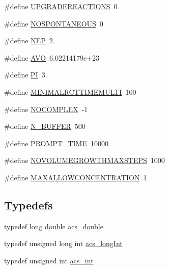 \begin{DoxyCompactItemize}
\#define \hyperlink{a00024_a5119e853077046684673dad15af9199f}{U\-P\-G\-R\-A\-D\-E\-R\-E\-A\-C\-T\-I\-O\-N\-S}~0
\item 
\#define \hyperlink{a00024_a9ea25e0eb039e29accaed6cb99632deb}{N\-O\-S\-P\-O\-N\-T\-A\-N\-E\-O\-U\-S}~0
\item 
\#define \hyperlink{a00024_a029d801cdb598a397cb99ea968a64dc2}{N\-E\-P}~2.
\item 
\#define \hyperlink{a00024_a174754c04acfba9e1f66ba249e68643a}{A\-V\-O}~6.\-02214179e+23
\item 
\#define \hyperlink{a00024_a598a3330b3c21701223ee0ca14316eca}{P\-I}~3.
\item 
\#define \hyperlink{a00024_aa7d0d45ef785688de1c634290ceb02e7}{M\-I\-N\-I\-M\-A\-L\-R\-C\-T\-T\-I\-M\-E\-M\-U\-L\-T\-I}~100
\item 
\#define \hyperlink{a00024_a8da7044a9c837d5544508f9fa400ea52}{N\-O\-C\-O\-M\-P\-L\-E\-X}~-\/1
\item 
\#define \hyperlink{a00024_a2608b9496c2fae19afe620cc801c1967}{N\-\_\-\-B\-U\-F\-F\-E\-R}~500
\item 
\#define \hyperlink{a00024_a6e32fce4415266c0aecd671afba386d5}{P\-R\-O\-M\-P\-T\-\_\-\-T\-I\-M\-E}~10000
\item 
\#define \hyperlink{a00024_aaa9f3c25a2df117014005dabd9c43f77}{N\-O\-V\-O\-L\-U\-M\-E\-G\-R\-O\-W\-T\-H\-M\-A\-X\-S\-T\-E\-P\-S}~1000
\item 
\#define \hyperlink{a00024_a49e518711039e167e47bd51aed053390}{M\-A\-X\-A\-L\-L\-O\-W\-C\-O\-N\-C\-E\-N\-T\-R\-A\-T\-I\-O\-N}~1
\end{DoxyCompactItemize}
\subsection*{Typedefs}
\begin{DoxyCompactItemize}
\item 
typedef long double \hyperlink{a00024_ab776853a005fcbf56af0424a2a4dd607}{acs\-\_\-double}
\item 
typedef unsigned long int \hyperlink{a00024_a19319d75f02db4308bc5c0026d98cd85}{acs\-\_\-long\-Int}
\item 
typedef unsigned int \hyperlink{a00024_a8d277355641a098190360234e2ebde35}{acs\-\_\-int}
\end{DoxyCompactItemize}


